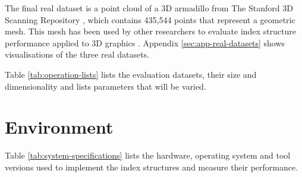 The final real dataset is a point cloud of a 3D armadillo from The Stanford 3D Scanning Repository \cite{armadillo-mesh}, which contains 435,544 points that represent a geometric mesh. This mesh has been used by other researchers to evaluate index structure performance applied to 3D graphics \cite{kd-tree-gpu, accelerating-kdtree-nn}. Appendix \ref{sec:app-real-datasets} shows visualisations of the three real datasets.

Table \ref{tab:operation-lists} lists the evaluation datasets, their size and
dimensionality and lists parameters that will be varied.

\begin{table}
	\centering
	\caption{Evaluation Datasets}
	\label{tab:operation-lists}
\end{table}

\section{Environment}

Table \ref{tab:system-specifications} lists the hardware, operating system and tool versions used to implement the index structures and measure their performance. 

